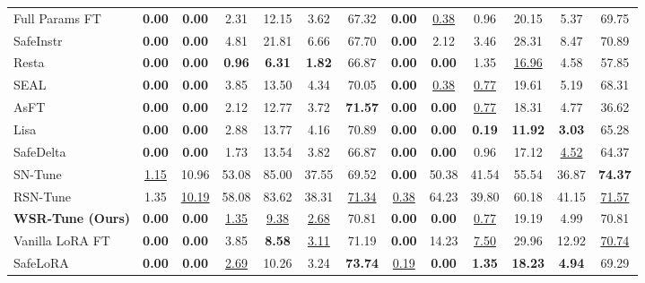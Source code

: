 \documentclass{article}
\begin{document}
\begin{table}[t]
{\begin{tabular}{lcccccc|cccccc}
Full Params FT
& \textbf{0.00} & \textbf{0.00} & 2.31 & 12.15 & 3.62 & 67.32
& \textbf{0.00} & \uline{0.38} & 0.96 & 20.15 & 5.37 & 69.75 \\

SafeInstr
& \textbf{0.00} & \textbf{0.00} & 4.81 & 21.81 & 6.66 & 67.70
& \textbf{0.00} & 2.12 & 3.46 & 28.31 & 8.47 & 70.89 \\

Resta
& \textbf{0.00} & \textbf{0.00} & \textbf{0.96} & \textbf{6.31} & \textbf{1.82} & 66.87
& \textbf{0.00} & \textbf{0.00} & 1.35 & \uline{16.96} & 4.58 & 57.85 \\

SEAL
& \textbf{0.00} & \textbf{0.00} & 3.85 & 13.50 & 4.34 & 70.05
& \textbf{0.00} & \uline{0.38} & \uline{0.77} & 19.61 & 5.19 & 68.31 \\

AsFT
& \textbf{0.00} & \textbf{0.00} & 2.12 & 12.77 & 3.72 & \textbf{71.57}
& \textbf{0.00} & \textbf{0.00} & \uline{0.77} & 18.31 & 4.77 & 36.62 \\

Lisa
& \textbf{0.00} & \textbf{0.00} & 2.88 & 13.77 & 4.16 & 70.89
& \textbf{0.00} & \textbf{0.00} & \textbf{0.19} & \textbf{11.92} & \textbf{3.03} & 65.28 \\

SafeDelta
& \textbf{0.00} & \textbf{0.00} & 1.73 & 13.54 & 3.82 & 66.87
& \textbf{0.00} & \textbf{0.00} & 0.96 & 17.12 & \uline{4.52} & 64.37 \\

SN-Tune
& \uline{1.15} & 10.96 & 53.08 & 85.00 & 37.55 & 69.52
& \textbf{0.00} & 50.38 & 41.54 & 55.54 & 36.87 & \textbf{74.37} \\

RSN-Tune
& 1.35 & \uline{10.19} & 58.08 & 83.62 & 38.31 & \uline{71.34}
& \uline{0.38} & 64.23 & 39.80 & 60.18 & 41.15 & \uline{71.57} \\

\textbf{WSR-Tune (Ours)}
& \textbf{0.00} & \textbf{0.00} & \uline{1.35} & \uline{9.38} & \uline{2.68} & 70.81
& \textbf{0.00} & \textbf{0.00} & \uline{0.77} & 19.19 & 4.99 & 70.81 \\

\midrule

Vanilla LoRA FT
& \textbf{0.00} & \textbf{0.00} & 3.85 & \textbf{8.58} & \uline{3.11} & 71.19
& \textbf{0.00} & 14.23 & \uline{7.50} & 29.96 & 12.92 & \uline{70.74} \\

SafeLoRA
& \textbf{0.00} & \textbf{0.00} & \uline{2.69} & 10.26 & 3.24 & \textbf{73.74}
& \uline{0.19} & \textbf{0.00} & \textbf{1.35} & \textbf{18.23} & \textbf{4.94} & 69.29 \\


\end{tabular}}
\end{table}
\end{document}
